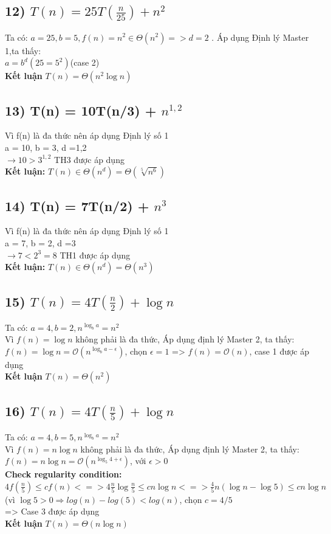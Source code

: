 \documentclass[10pt,a4paper]{article}
\begin{document}
\subsection*{12) $T(n) = 25T(\frac{n}{25}) + n^2$}
Ta có: $a = 25, b = 5 , f(n) = n^2 \in \Theta(n^2) => d = 2$ . Áp dụng Định lý Master 1,ta thấy:\\
$a = b^d (25=5^2)$(case 2)\\
\textbf{Kết luận} $T(n) = \Theta(n^2\log{n})$
\subsection*{13) T(n) = 10T(n/3) + $n^{1,2}$}
Vì f(n)  là đa thức nên áp dụng Định lý số 1\\
a = 10, b = 3, d =1,2 \\
$\rightarrow 10 > 3^{1,2} $ TH3 được áp dụng\\
\textbf{Kết luận: }$T(n) \in \Theta(n^d) = \Theta(\sqrt[5]{n^6})$
\subsection*{14) T(n) = 7T(n/2) + $n^3$}
Vì f(n) là đa thức nên áp dụng Định lý số 1\\
a = 7, b = 2, d =3 \\
$\rightarrow 7 < 2^3 = 8$ TH1 được áp dụng\\
\textbf{Kết luận: }$T(n) \in \Theta(n^d) = \Theta(n^3)$
\subsection*{15) $T(n) = 4T(\frac{n}{2}) + \log{n}$}
Ta có: $a = 4, b = 2 , n^{\log_b{a}} = n^2$\\
Vì $f(n) = \log{n}$ không phải là đa thức, Áp dụng định lý Master 2, ta thấy: \\
$f(n) = \log{n} = \mathcal{O}(n^{\log_b{a} - \epsilon})$, chọn $\epsilon = 1$
=> $f(n) = \mathcal{O}(n)$, case 1 được áp dụng \\
\textbf{Kết luận} $T(n) = \Theta(n^2)$
\subsection*{16) $T(n) = 4T(\frac{n}{5}) + \log{n}$}
Ta có: $a = 4, b = 5 , n^{\log_b{a}} = n^2$\\
Vì $f(n) = n\log{n}$ không phải là đa thức, Áp dụng định lý Master 2, ta thấy: \\
$f(n) = n\log{n} = \mathcal{O}(n^{{\log_5{4}} + \epsilon})$, với $\epsilon > 0$\\
\textbf{Check regularity condition:}\\
$4f(\frac{n}{5}) \leq cf(n) <=> 4{\frac{n}{5}}\log{\frac{n}{5}} \leq cn\log{n} <=> \frac{4}{5}n(\log{n} - \log{5}) \leq cn\log{n}$ (vì $\log{5} >0\Rightarrow log(n) - log(5) < log(n) $, chọn $c = 4/5$ \\ 
=> Case 3 được áp dụng \\
\textbf{Kết luận} $T(n) = \Theta(n\log{n})$
\end{document}
